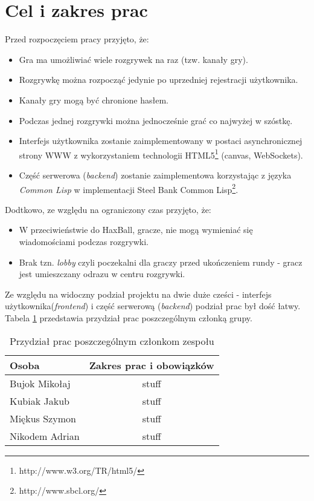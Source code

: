\section{Cel i zakres prac}
Przed rozpoczęciem pracy przyjęto, że:
\begin{itemize}\itemsep0em
  \item Gra ma umożliwiać wiele rozgrywek na raz (tzw. kanały gry).
  \item Rozgrywkę można rozpocząć jedynie po uprzedniej rejestracji użytkownika.
  \item Kanały gry mogą być chronione hasłem.
  \item Podczas jednej rozgrywki można jednocześnie grać co najwyżej w szóstkę.
  \item Interfejs użytkownika zostanie zaimplementowany w postaci asynchronicznej strony WWW z wykorzystaniem technologii HTML5\footnote{http://www.w3.org/TR/html5/} (canvas, WebSockets).
  \item Część serwerowa (\emph{backend}) zostanie zaimplementowa korzystając z języka \emph{Common Lisp} w implementacji Steel Bank Common Lisp\footnote{http://www.sbcl.org/}.
\end{itemize}
Dodtkowo, ze względu na ograniczony czas przyjęto, że:
\begin{itemize}
  \item W przeciwieństwie do HaxBall, gracze, nie mogą wymieniać się wiadomościami podczas rozgrywki.
  \item Brak tzn. \emph{lobby} czyli poczekalni dla graczy przed ukończeniem rundy - gracz jest umieszczany odrazu w centru rozgrywki.
\end{itemize}

Ze względu na widoczny podział projektu na dwie duże cześci - interfejs użytkownika(\emph{frontend}) i część serwerową (\emph{backend}) podział prac był dość łatwy. Tabela \ref{tab:podzial} przedstawia przydział prac poszczególnym członką grupy.

\begin{table}[h]
  \centering
  \begin{tabular}{ |l|c| }
    \hline
    Osoba & Zakres prac i obowiązków \\ \hline
    Bujok Mikołaj & stuff \\
    Kubiak Jakub & stuff \\
    Miękus Szymon & stuff \\
    Nikodem Adrian & stuff \\
    \hline
  \end{tabular}
  \caption{Przydział prac poszczególnym członkom zespołu}
  \label{tab:podzial}
\end{table}
